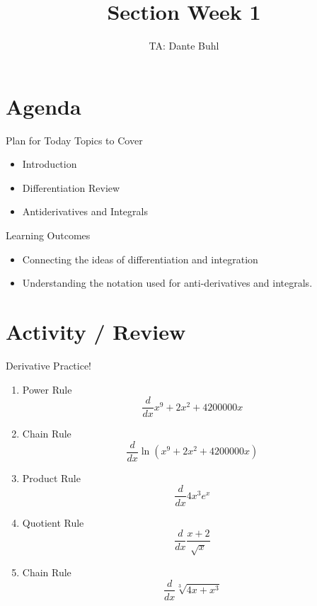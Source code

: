 \documentclass{beamer}
\title{Section Week 1}
\author{TA: Dante Buhl}
\institute{UCSC AM-11B}
\begin{document}
\newcommand{\bmp}[1]{\begin{minipage}{#1\textwidth}}
\newcommand{\emp}{\end{minipage}}

\frame{\titlepage}

\section{Agenda}
\begin{frame}{Plan for Today}
    Topics to Cover
    \begin{itemize}
        \item Introduction
        \item Differentiation Review
        \item Antiderivatives and Integrals
    \end{itemize}
\end{frame}

\begin{frame}{Learning Outcomes}
    \begin{itemize}
        \item Connecting the ideas of differentiation and integration
        \item Understanding the notation used for anti-derivatives and integrals.
    \end{itemize}
\end{frame}

\section{Activity / Review}

\begin{frame}{Derivative Practice!}

    \begin{enumerate}

        \item Power Rule\[\frac{d}{dx} x^9 + 2x^2 + 4200000x\]

        \item Chain Rule\[\frac{d}{dx} \ln(x^9 + 2x^2 + 4200000x)\]

        \item Product Rule\[\frac{d}{dx} 4x^3e^x\]
    
        \item Quotient Rule\[\frac{d}{dx} \frac{x+2}{\sqrt{x}}\]

        \item Chain Rule\[\frac{d}{dx} \sqrt[3]{4x + x^3}\]

    \end{enumerate}

\end{frame}
\end{document}
